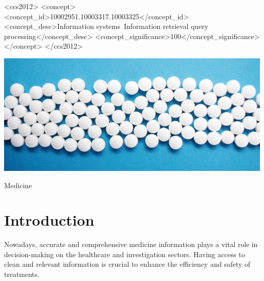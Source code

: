 \documentclass[sigconf]{acmart}
\begin{document}
\begin{CCSXML}
<ccs2012>
   <concept>
       <concept_id>10002951.10003317.10003325</concept_id>
       <concept_desc>Information systems~Information retrieval query processing</concept_desc>
       <concept_significance>100</concept_significance>
       </concept>
 </ccs2012>
\end{CCSXML}


\begin{teaserfigure}
  \includegraphics[width=\textwidth]{medicine.png}
  \caption{Medicine}
  \Description{}
  \label{fig:teaser}
\end{teaserfigure}


\maketitle

\section{Introduction}
Nowadays, accurate and comprehensive medicine information plays a vital role in decision-making on the healthcare and investigation sectors. Having access to clean and relevant information is crucial to enhance the efficiency and safety of treatments.
\end{document}
